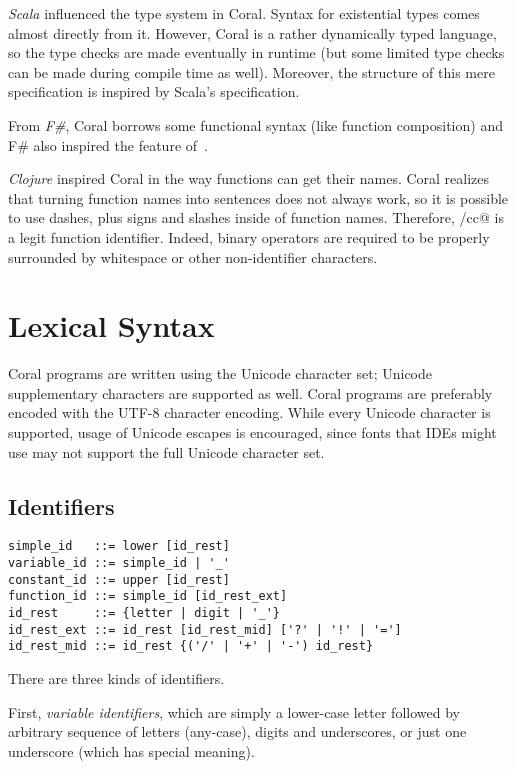 \emph{Scala} influenced the type system in Coral. Syntax for existential types comes almost directly from it. However, Coral is a rather dynamically typed language, so the type checks are made eventually in runtime (but some limited type checks can be made during compile time as well). Moreover, the structure of this mere specification is inspired by Scala's specification. 

From \emph{F\#}, Coral borrows some functional syntax (like function composition) and F\# also inspired the feature of~. 

\emph{Clojure} inspired Coral in the way functions can get their names. Coral realizes that turning function names into sentences does not always work, so it is possible to use dashes, plus signs and slashes inside of function names. Therefore, \lstinline@call/cc@ is a legit function identifier. Indeed, binary operators are required to be properly surrounded by whitespace or other non-identifier characters. 

\chapter{Lexical Syntax}

Coral programs are written using the Unicode character set; Unicode supplementary characters are supported as well. Coral programs are preferably encoded with the UTF-8 character encoding. While every Unicode character is supported, usage of Unicode escapes is encouraged, since fonts that IDEs might use may not support the full Unicode character set.

\newpage

\section{Identifiers}\label{sec:identifiers}

\syntax\begin{lstlisting}
simple_id   ::= lower [id_rest]
variable_id ::= simple_id | '_'
constant_id ::= upper [id_rest]
function_id ::= simple_id [id_rest_ext]
id_rest     ::= {letter | digit | '_'}
id_rest_ext ::= id_rest [id_rest_mid] ['?' | '!' | '=']
id_rest_mid ::= id_rest {('/' | '+' | '-') id_rest}
\end{lstlisting}

There are three kinds of identifiers.

First, \textit{variable identifiers}, which are simply a lower-case letter followed by arbitrary sequence of letters (any-case), digits and underscores, or just one underscore (which has special meaning).


